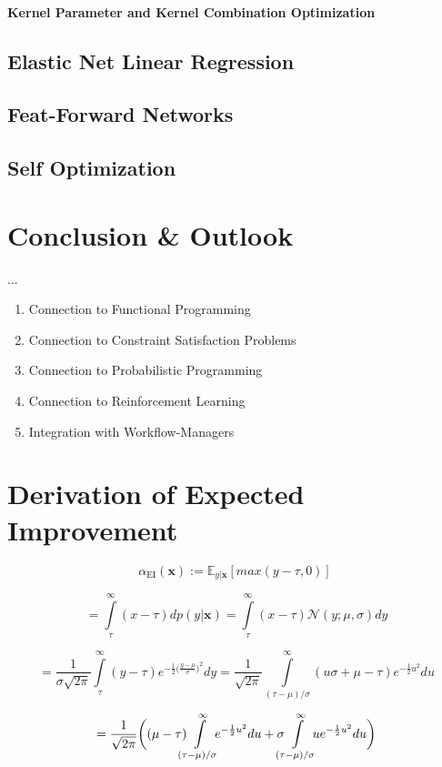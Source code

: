 \documentclass[english]{article}
\newcommand{\EI}{\operatorname{EI}}
\newcommand{\x}{\mathbf{x}}
\begin{document}
\paragraph{Kernel Parameter and Kernel Combination Optimization}
\subsection{Elastic Net Linear Regression}
\subsection{Feat-Forward Networks}
\subsection{Self Optimization}

\section{Conclusion \& Outlook}
...

\begin{enumerate}
  \item{Connection to Functional Programming}
  \item{Connection to Constraint Satisfaction Problems}
  \item{Connection to Probabilistic Programming}
  \item{Connection to Reinforcement Learning}
  \item{Integration with Workflow-Managers}
\end{enumerate}



\appendix

\section{Derivation of Expected Improvement}
\label{EI derivation}

$$\alpha_{\EI}(\x) := \mathbb{E}_{y|\x}[max(y-\tau, 0)]\ $$

$$= \int\limits_{\tau}^{\infty}(x-\tau)dp(y|\x) = \int\limits_{\tau}^{\infty}(x-\tau)\mathcal{N}(y;\mu,\sigma)dy$$

$$ = \frac{1}{\sigma\sqrt{2\pi}} \int\limits_{\tau}^{\infty}(y-\tau)e^{-\frac{1}{2}\big(\frac{y-\mu}{\sigma}\big)^2}dy =
\frac{1}{\sqrt{2\pi}} \int\limits_{(\tau-\mu)/\sigma}^{\infty}(u\sigma+\mu-\tau)e^{-\frac{1}{2}u^2}du$$

$$=\frac{1}{\sqrt{2\pi}}\bigg((\mu-\tau) \mkern-12mu \int\limits_{(\tau-\mu)/\sigma}^{\infty} \mkern-10mu e^{-\frac{1}{2}u^2}du + \sigma \mkern-12mu \int\limits_{(\tau-\mu)/\sigma}^{\infty} \mkern-10mu u e^{-\frac{1}{2}u^2}du \bigg)$$
\end{document}
